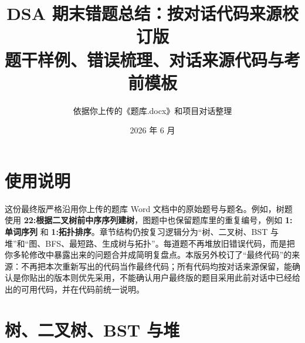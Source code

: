\documentclass[10pt,a4paper,fontset=none]{ctexart}
\title{\bfseries DSA 期末错题总结：按对话代码来源校订版\\\large 题干样例、错误梳理、对话来源代码与考前模板}
\author{依据你上传的《题库.docx》和项目对话整理}
\date{2026 年 6 月}
\begin{document}
\maketitle
\tableofcontents
\newpage

\section*{使用说明}
这份最终版严格沿用你上传的题库 Word 文档中的原始题号与题名。例如，树题使用 \textbf{22:根据二叉树前中序序列建树}，图题中也保留题库里的重复编号，例如 \textbf{1:单词序列} 和 \textbf{1:拓扑排序}。章节结构仍按复习逻辑分为“树、二叉树、BST 与堆”和“图、BFS、最短路、生成树与拓扑”。每道题不再堆放旧错误代码，而是把你多轮修改中暴露出来的问题合并成简明复盘点。本版另外校订了“最终代码”的来源：不再把本次重新写出的代码当作最终代码；所有代码均按对话来源保留，能确认是你贴出的版本则优先采用，不能确认用户最终版的题目采用此前对话中已经给出的可用代码，并在代码前统一说明。

\section{树、二叉树、BST 与堆}
\end{document}
